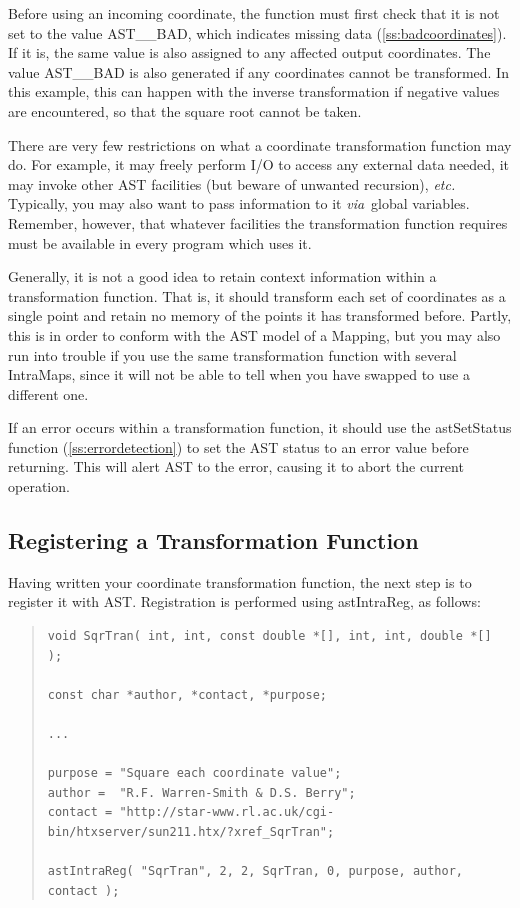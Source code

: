 \documentclass[twoside,11pt]{article}
\newcommand{\htmlref}[2]{#1}
\newcommand{\secref}[1]{\S\ref{#1}}
\renewcommand{\secref}[1]{\ref{#1}}
\begin{document}
Before using an incoming coordinate, the function must first check
that it is not set to the value AST\_\_BAD, which indicates missing
data (\secref{ss:badcoordinates}). If it is, the same value is also
assigned to any affected output coordinates. The value AST\_\_BAD is
also generated if any coordinates cannot be transformed. In this
example, this can happen with the inverse transformation if negative
values are encountered, so that the square root cannot be taken.

There are very few restrictions on what a coordinate transformation
function may do. For example, it may freely perform I/O to access any
external data needed, it may invoke other AST facilities (but beware
of unwanted recursion), {\em{etc.}} Typically, you may also want to
pass information to it {\em{via}}\ global variables. Remember,
however, that whatever facilities the transformation function requires
must be available in every program which uses it.

Generally, it is not a good idea to retain context information within
a transformation function. That is, it should transform each set of
coordinates as a single point and retain no memory of the points it
has transformed before. Partly, this is in order to conform with the
AST model of a Mapping, but you may also run into trouble if you use
the same transformation function with several IntraMaps, since it will
not be able to tell when you have swapped to use a different one.

If an error occurs within a transformation function, it should use the
\htmlref{astSetStatus}{astSetStatus} function (\secref{ss:errordetection}) to set the AST
status to an error value before returning. This will alert AST to the
error, causing it to abort the current operation.

\subsection{\label{ss:registeringintramaps}Registering a Transformation Function}

Having written your coordinate transformation function, the next step
is to register it with AST. Registration is performed using
\htmlref{astIntraReg}{astIntraReg}, as follows:

\begin{quote}
\small
\begin{verbatim}
void SqrTran( int, int, const double *[], int, int, double *[] );

const char *author, *contact, *purpose;

...

purpose = "Square each coordinate value";
author =  "R.F. Warren-Smith & D.S. Berry";
contact = "http://star-www.rl.ac.uk/cgi-bin/htxserver/sun211.htx/?xref_SqrTran";

astIntraReg( "SqrTran", 2, 2, SqrTran, 0, purpose, author, contact );
\end{verbatim}
\normalsize
\end{quote}
\end{document}
